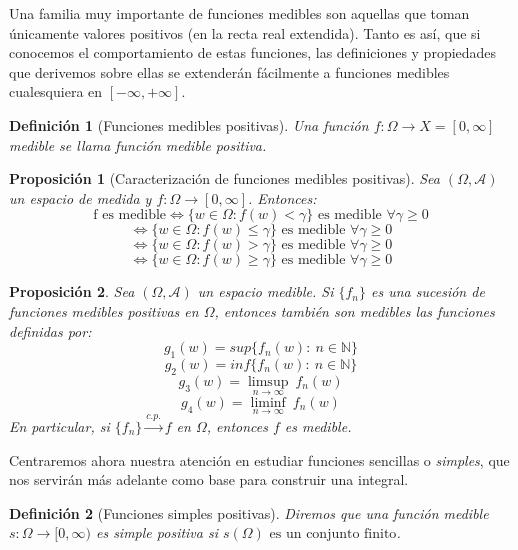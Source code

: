 \documentclass[11pt, a4paper]{article}
\newcommand{\fn}{\{f_n\}}
\theoremstyle{theorem-style}
\newtheorem{nprop}{Proposición}[section]
\theoremstyle{definition-style}
\newtheorem{ndef}{Definición}[section]
\theoremstyle{remark-style}
\theoremstyle{example-style}
\begin{document}
Una familia muy importante de funciones medibles son aquellas que toman únicamente valores positivos (en la recta real extendida). Tanto es así, que si conocemos el comportamiento de estas funciones, las definiciones y propiedades que derivemos sobre ellas se extenderán fácilmente a funciones medibles cualesquiera en $[-\infty,+\infty]$.

\begin{ndef}[Funciones medibles positivas]
	Una función $f: \Omega \to X = [0,\infty ]$ medible se llama función medible positiva.
\end{ndef}


\begin{nprop}[Caracterización de funciones medibles positivas]
	Sea $(\Omega,\mathcal{A})$ un espacio de medida y $f:\Omega \to [0,\infty]$. Entonces:
	\[
	\text{f es medible} \iff \{w \in \Omega : f(w) < \gamma \} \text{ es medible } \forall \gamma \geq 0
	\]
	\[
	\iff \{w \in \Omega : f(w) \leq \gamma \} \text{ es medible } \forall \gamma \geq 0
	\]
	\[
	\iff \{w \in \Omega : f(w) > \gamma \} \text{ es medible } \forall \gamma \geq 0
	\]
	\[
	\iff \{w \in \Omega : f(w) \geq \gamma \} \text{ es medible } \forall \gamma \geq 0
	\]
\end{nprop}

\begin{nprop} \label {p1}
	Sea $(\Omega,\mathcal{A})$ un espacio medible. Si $\{f_n\}$ es una sucesión de funciones medibles positivas en $\Omega$, entonces también son medibles las funciones definidas por:
	\[
	g_1(w) =  sup\{f_n(w) : \ n \in \mathbb{N} \}
	\]
	\[
	g_2(w) =  inf\{f_n(w) : \ n \in \mathbb{N} \}
	\]
	\[
	g_3(w) = \limsup_{n\to \infty} \ f_n(w)
	\]
	\[
	g_4(w) = \liminf_{n\to \infty}  \ f_n(w)
	\]
En particular, si $\fn \xrightarrow{c.p.} f$ en $\Omega$, entonces $f$ es medible.
\end{nprop}

Centraremos ahora nuestra atención en estudiar funciones sencillas o \textit{simples}, que nos servirán más adelante como base para construir una integral.

\begin{ndef}[Funciones simples positivas]
	Diremos que una función medible $s: \Omega \to [0,\infty)$ es simple positiva si 
$s(\Omega) \text{ es un conjunto finito}$.
\end{ndef}
\end{document}
